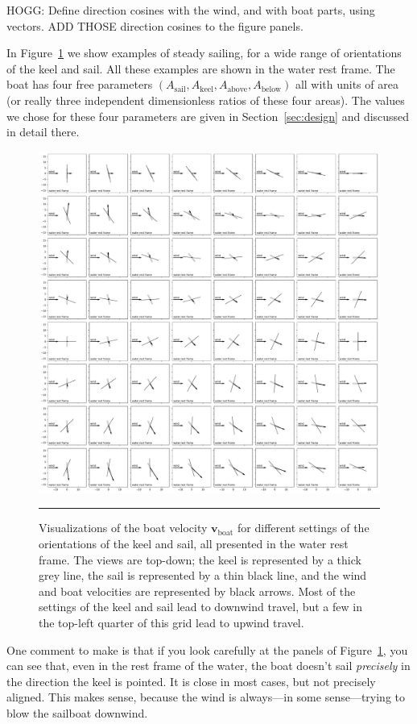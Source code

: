 \documentclass[letterpaper]{article}
\renewcommand{\vec}[1]{\boldsymbol{#1}}
\newcommand{\boat}{\text{boat}}
\newcommand{\sail}{\text{sail}}
\newcommand{\keel}{\text{keel}}
\renewcommand{\above}{\text{above}}
\newcommand{\below}{\text{below}}
\newcommand{\vboat}{\vec{v}_\boat}
\newcommand{\secref}[1]{Section~\ref{#1}}
\newcommand{\figref}[1]{Figure~\ref{#1}}
\newcommand{\figurerule}{\rule[1ex]{\textwidth}{0.2pt}}
\begin{document}
HOGG: Define direction cosines with the wind, and with boat parts, using vectors. ADD THOSE direction cosines to the figure panels.

In \figref{fig:steady} we show examples of steady sailing, for a wide range of orientations of the keel and sail.
All these examples are shown in the water rest frame.
The boat has four free parameters $(A_\sail,A_\keel,A_{\above},A_{\below})$ all with units of area (or really three independent dimensionless ratios of these four areas).
The values we chose for these four parameters are given in \secref{sec:design} and discussed in detail there.
\begin{figure}[t!]
  \includegraphics[width=\textwidth]{steady.pdf}
  \caption{Visualizations of the boat velocity $\vboat$ for different settings of the orientations of the keel and sail, all presented in the water rest frame.
  The views are top-down; the keel is represented by a thick grey line, the sail is represented by a thin black line, and the wind and boat velocities are represented by black arrows.
  Most of the settings of the keel and sail lead to downwind travel, but a few in the top-left quarter of this grid lead to upwind travel.\label{fig:steady}}
  \figurerule
\end{figure}

One comment to make is that if you look carefully at the panels of \figref{fig:steady}, you can see that, even in the rest frame of the water, the boat doesn't sail \emph{precisely} in the direction the keel is pointed.
It is close in most cases, but not precisely aligned.
This makes sense, because the wind is always---in some sense---trying to blow the sailboat downwind.
\end{document}
